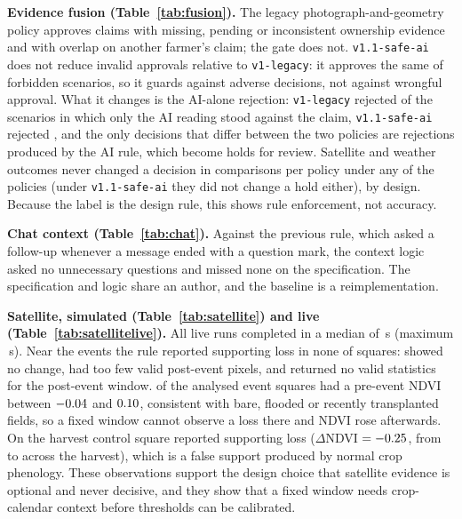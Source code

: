 \documentclass{ieeeaccess}
\begin{document}
\textbf{Evidence fusion (Table~\ref{tab:fusion}).} The legacy photograph-and-geometry policy approves claims with missing, pending or inconsistent ownership evidence and with overlap on another farmer's claim; the gate does not. \texttt{v1.1-safe-ai} does not reduce invalid approvals relative to \texttt{v1-legacy}: it approves the same \FusionSafeAiInvalidApprovals{} of \FusionInvalidApprovalDenominator{} forbidden scenarios, so it guards against adverse decisions, not against wrongful approval. What it changes is the AI-alone rejection: \texttt{v1-legacy} rejected \FusionLegacyRejectedOnAiAlone{} of the \FusionAiAloneScenarios{} scenarios in which only the AI reading stood against the claim, \texttt{v1.1-safe-ai} rejected \FusionSafeAiRejectedOnAiAlone{}, and the only decisions that differ between the two policies are \FusionSafeAiChangedDecisions{} rejections produced by the AI rule, which become holds for review. Satellite and weather outcomes never changed a decision in \FusionComparisonsPerPolicy{} comparisons per policy under any of the \PolicyCountWord{} policies (under \texttt{v1.1-safe-ai} they did not change a hold either), by design. Because the label is the design rule, this shows rule enforcement, not accuracy.

\textbf{Chat context (Table~\ref{tab:chat}).} Against the previous rule, which asked a follow-up whenever a message ended with a question mark, the context logic asked no unnecessary questions and missed none on the specification. The specification and logic share an author, and the baseline is a reimplementation.

\textbf{Satellite, simulated (Table~\ref{tab:satellite}) and live (Table~\ref{tab:satellitelive}).} All \SatLiveSquares{} live runs completed in a median of \SatLatencyMedianSeconds\,s (maximum \SatLatencyMaxSeconds\,s). Near the \SatEventCountWord{} events the rule reported supporting loss in none of \SatEventSquares{} squares: \SatEventNoChange{} showed no change, \SatEventTooFewValid{} had too few valid post-event pixels, and \SatEventNoPostData{} returned no valid statistics for the post-event window. \SatLowPreNdviCountCapWord{} of the analysed event squares had a pre-event NDVI between $-0.04$ and $0.10$, consistent with bare, flooded or recently transplanted fields, so a fixed window cannot observe a loss there and NDVI rose afterwards. On the harvest control \SatControlSupportsWord{} square reported supporting loss ($\Delta$NDVI $=-0.25$, from \SatControlSupportPreNdvi{} to \SatControlSupportPostNdvi{} across the harvest), which is a false support produced by normal crop phenology. These observations support the design choice that satellite evidence is optional and never decisive, and they show that a fixed window needs crop-calendar context before thresholds can be calibrated.
\end{document}
